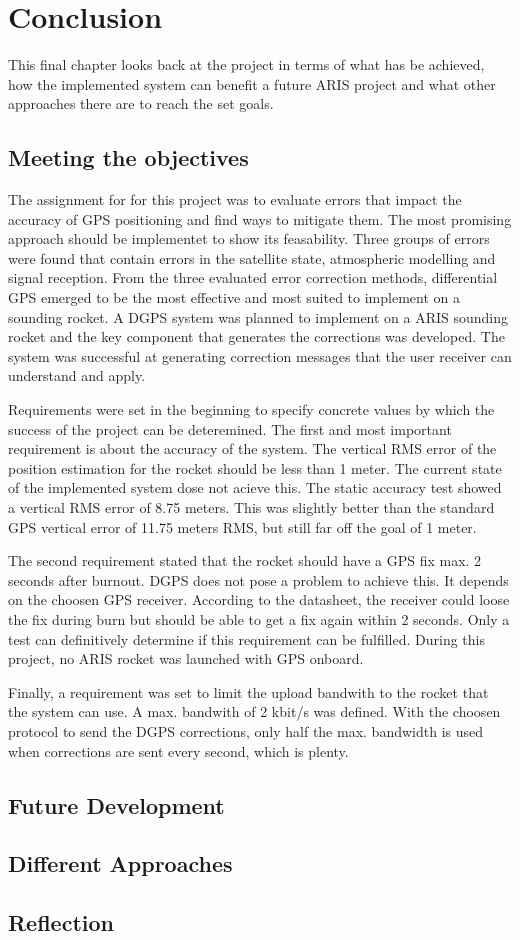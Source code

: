 \chapter{Conclusion}

This final chapter looks back at the project in terms of what has be achieved, how the implemented system can benefit a future ARIS project and what other approaches there are to reach the set goals.

\section{Meeting the objectives}

The assignment for for this project was to evaluate errors that impact the accuracy of GPS positioning and find ways to mitigate them.
The most promising approach should be implementet to show its feasability.
Three groups of errors were found that contain errors in the satellite state, atmospheric modelling and signal reception.
From the three evaluated error correction methods, differential GPS emerged to be the most effective and most suited to implement on a sounding rocket.
A DGPS system was planned to implement on a ARIS sounding rocket and the key component that generates the corrections was developed.
The system was successful at generating correction messages that the user receiver can understand and apply.

Requirements were set in the beginning to specify concrete values by which the success of the project can be deteremined.
The first and most important requirement is about the accuracy of the system.
The vertical RMS error of the position estimation for the rocket should be less than 1 meter.
The current state of the implemented system dose not acieve this.
The static accuracy test showed a vertical RMS error of 8.75 meters.
This was slightly better than the standard GPS vertical error of 11.75 meters RMS, but still far off the goal of 1 meter.

The second requirement stated that the rocket should have a GPS fix max. 2 seconds after burnout.
DGPS does not pose a problem to achieve this.
It depends on the choosen GPS receiver.
According to the datasheet, the receiver could loose the fix during burn but should be able to get a fix again within 2 seconds.
Only a test can definitively determine if this requirement can be fulfilled.
During this project, no ARIS rocket was launched with GPS onboard.

Finally, a requirement was set to limit the upload bandwith to the rocket that the system can use.
A max. bandwith of 2 kbit/s was defined.
With the choosen protocol to send the DGPS corrections, only half the max. bandwidth is used when corrections are sent every second, which is plenty.

\section{Future Development}

\section{Different Approaches}



\section{Reflection}

